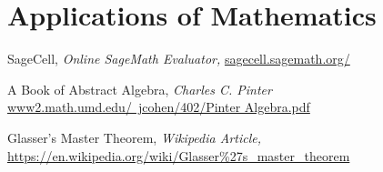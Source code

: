 \documentclass[12pt, oneside]{book}
\begin{document}
\part{Applications of Mathematics}


  

%  

\begin{thebibliography}{9}
	
 SageCell, \textit{Online SageMath Evaluator,}
\href{https://sagecell.sagemath.org/}{sagecell.sagemath.org/}

 A Book of Abstract Algebra, \textit{Charles C. Pinter}
\href{http://www2.math.umd.edu/~jcohen/402/Pinter%20Algebra.pdf}{www2.math.umd.edu/~jcohen/402/Pinter Algebra.pdf}

 Glasser's Master Theorem, \textit{Wikipedia Article,}
\href{https://en.wikipedia.org/wiki/Glasser%27s_master_theorem}
     {https://en.wikipedia.org/wiki/Glasser\%27s\_master\_theorem}

\end{thebibliography}
\end{document}
